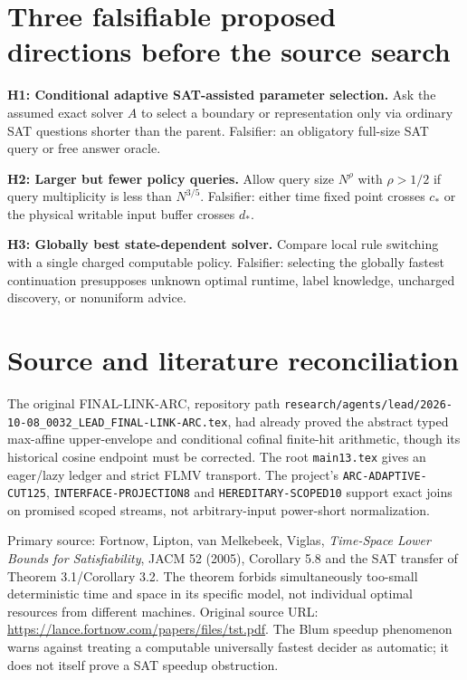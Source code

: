 \documentclass[11pt]{article}
\begin{document}
\section{Three falsifiable proposed directions before the source search}
\noindent\textbf{H1: Conditional adaptive SAT-assisted parameter selection.} Ask the assumed exact solver $A$ to select a boundary or representation only via ordinary SAT questions shorter than the parent. Falsifier: an obligatory full-size SAT query or free answer oracle.
\par\noindent\textbf{H2: Larger but fewer policy queries.} Allow query size $N^\rho$ with $\rho>1/2$ if query multiplicity is less than $N^{3/5}$. Falsifier: either time fixed point crosses $c_*$ or the physical writable input buffer crosses $d_*$.
\par\noindent\textbf{H3: Globally best state-dependent solver.} Compare local rule switching with a single charged computable policy. Falsifier: selecting the globally fastest continuation presupposes unknown optimal runtime, label knowledge, uncharged discovery, or nonuniform advice.

\section{Source and literature reconciliation}
The original FINAL-LINK-ARC, repository path \texttt{research/agents/lead/2026-10-08\_0032\_LEAD\_FINAL-LINK-ARC.tex}, had already proved the abstract typed max-affine upper-envelope and conditional cofinal finite-hit arithmetic, though its historical cosine endpoint must be corrected. The root \texttt{main13.tex} gives an eager/lazy ledger and strict FLMV transport. The project's \texttt{ARC-ADAPTIVE-CUT125}, \texttt{INTERFACE-PROJECTION8} and \texttt{HEREDITARY-SCOPED10} support exact joins on promised scoped streams, not arbitrary-input power-short normalization.

Primary source: Fortnow, Lipton, van Melkebeek, Viglas, \emph{Time-Space Lower Bounds for Satisfiability}, JACM 52 (2005), Corollary 5.8 and the SAT transfer of Theorem 3.1/Corollary 3.2. The theorem forbids simultaneously too-small deterministic time and space in its specific model, not individual optimal resources from different machines. Original source URL: \url{https://lance.fortnow.com/papers/files/tst.pdf}. The Blum speedup phenomenon warns against treating a computable universally fastest decider as automatic; it does not itself prove a SAT speedup obstruction.
\end{document}
